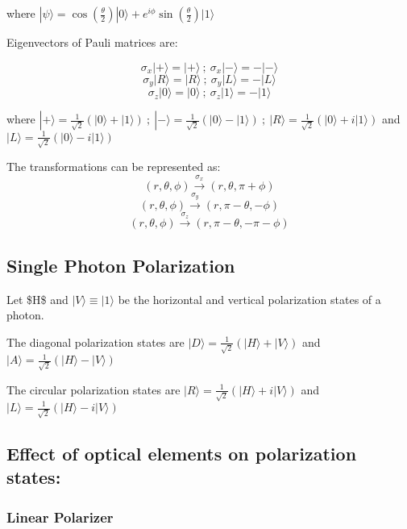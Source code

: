 \documentclass[
  letterpaper,
  DIV=11,
  numbers=noendperiod]{scrreprt}
\begin{document}
where
\(|\psi\rangle = \cos(\frac{\theta}{2}) |0\rangle + e^{i\phi} \sin(\frac{\theta}{2}) |1\rangle\)

Eigenvectors of Pauli matrices are:

\[\sigma_x |+\rangle = |+\rangle\ ;\ \sigma_x |-\rangle = -|-\rangle\]
\[\sigma_y |R\rangle = |R\rangle\ ;\ \sigma_y |L\rangle = -|L\rangle\]
\[\sigma_z |0\rangle = |0\rangle\ ;\ \sigma_z |1\rangle = -|1\rangle\]

where
\(|+\rangle = \frac{1}{\sqrt{2}} (|0\rangle + |1\rangle)\ ;\ |-\rangle = \frac{1}{\sqrt{2}} (|0\rangle - |1\rangle)\ ;\ |R\rangle = \frac{1}{\sqrt{2}} (|0\rangle + i|1\rangle)\)
and \(|L\rangle = \frac{1}{\sqrt{2}} (|0\rangle - i|1\rangle)\)

The transformations can be represented as:
\[(r, \theta, \phi) \overset{\sigma_x}{\rightarrow} (r, \theta, \pi + \phi)\]
\[(r, \theta, \phi) \overset{\sigma_y}{\rightarrow} (r, \pi - \theta, -\phi)\]
\[(r, \theta, \phi) \overset{\sigma_z}{\rightarrow} (r, \pi - \theta, -\pi - \phi)\]

\subsection*{Single Photon
Polarization}\label{single-photon-polarization}

Let \$\textbar H\rangle \equiv {}\rangle \$ and
\(|V\rangle \equiv |1\rangle\) be the horizontal and vertical
polarization states of a photon.

The diagonal polarization states are
\(|D\rangle = \frac{1}{\sqrt{2}} (|H\rangle + |V\rangle)\) and
\(|A\rangle = \frac{1}{\sqrt{2}} (|H\rangle - |V\rangle)\)

The circular polarization states are
\(|R\rangle = \frac{1}{\sqrt{2}} (|H\rangle + i|V\rangle)\) and
\(|L\rangle = \frac{1}{\sqrt{2}} (|H\rangle - i|V\rangle)\)

\subsection*{Effect of optical elements on polarization
states:}\label{effect-of-optical-elements-on-polarization-states}

\subsubsection*{Linear Polarizer}\label{linear-polarizer}
\end{document}
